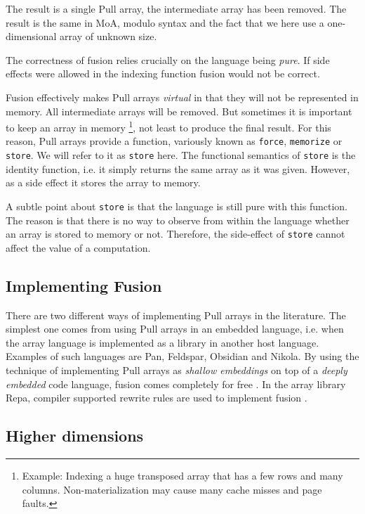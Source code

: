 \documentclass[preprint]{sigplanconf}
\begin{document}
The result is a single Pull array, the intermediate array has been
removed. The result is the same in MoA, modulo syntax and the fact
that we here use a one-dimensional array of unknown size.

The correctness of fusion relies crucially on the language being
\emph{pure}. If side effects were allowed in the indexing function
fusion would not be correct.

Fusion effectively makes Pull arrays \emph{virtual} in that they will
not be represented in memory. All intermediate arrays will be
removed. But sometimes it is important to keep an array in memory
\footnote{Example: Indexing a huge transposed array that has a few rows and many columns. Non-materialization
may cause many cache misses and page faults.}, 
not least to produce the final result. For this reason, Pull arrays
provide a function, variously known as \verb!force!, \verb!memorize!
  or \verb!store!. We will refer to it as \verb!store! here. The
  functional semantics of \verb!store! is the identity function,
  i.e. it simply returns the same array as it was given. However, as a
  side effect it stores the array to memory.

A subtle point about \verb!store! is that the language is still pure
with this function. The reason is that there is no way to observe from
within the language whether an array is stored to memory or
not. Therefore, the side-effect of \verb!store! cannot affect the
value of a computation.

\subsection{Implementing Fusion}

There are two different ways of implementing Pull arrays in the
literature. The simplest one comes from using Pull arrays in an
embedded language, i.e. when the array language is implemented as a
library in another host language. Examples of such languages are
Pan\cite{elliott2003compiling}, Feldspar\cite{Axelsson:2010:Feldspar},
Obsidian\cite{Svensson:2011:Obsidian} and
Nikola\cite{Mainland:2010:Nikola}. By using the technique of
implementing Pull arrays as \emph{shallow embeddings} on top of a
\emph{deeply embedded} code language, fusion comes completely for free
\cite{svenningsson2013combining}.
In the array library Repa\cite{keller2010regular}, compiler supported
rewrite rules are used to implement fusion \cite{jones2001playing}.


\subsection{Higher dimensions}
\end{document}
